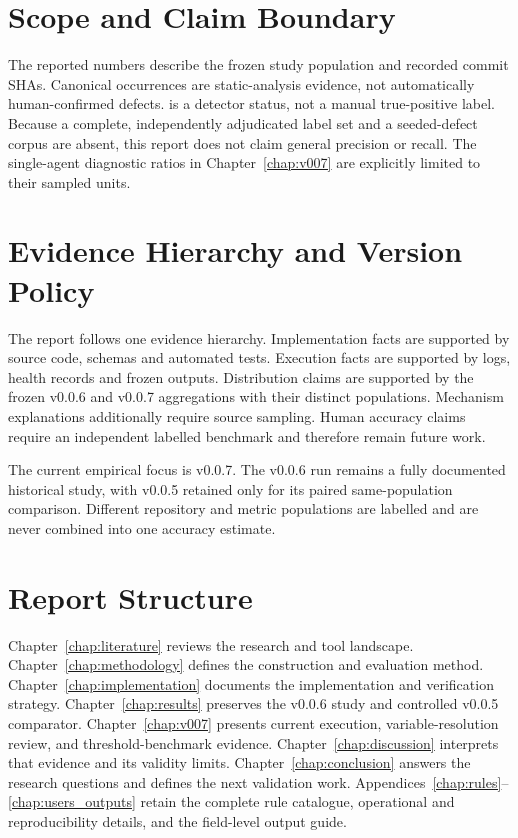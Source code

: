 \section{Scope and Claim Boundary}
The reported numbers describe the frozen study population and recorded commit
SHAs. Canonical occurrences are static-analysis evidence, not automatically
human-confirmed defects.  is a detector status, not a manual
true-positive label. Because a complete, independently adjudicated label set
and a seeded-defect corpus are absent, this report does not claim general
precision or recall. The single-agent diagnostic ratios in
Chapter~\ref{chap:v007} are explicitly limited to their sampled units.

\section{Evidence Hierarchy and Version Policy}
The report follows one evidence hierarchy. Implementation facts are supported
by source code, schemas and automated tests. Execution facts are supported by
logs, health records and frozen outputs. Distribution claims are supported by
the frozen v0.0.6 and v0.0.7 aggregations with their distinct populations.
Mechanism explanations additionally require source sampling. Human accuracy
claims require an independent labelled
benchmark and therefore remain future work.

The current empirical focus is v0.0.7. The v0.0.6 run remains a fully
documented historical study, with v0.0.5 retained only for its paired
same-population comparison. Different repository and metric populations are
labelled and are never combined into one accuracy estimate.

\section{Report Structure}
Chapter~\ref{chap:literature} reviews the research and tool landscape.
Chapter~\ref{chap:methodology} defines the construction and evaluation method.
Chapter~\ref{chap:implementation} documents the implementation and verification
strategy. Chapter~\ref{chap:results} preserves the v0.0.6 study and controlled
v0.0.5 comparator. Chapter~\ref{chap:v007} presents current execution,
variable-resolution review, and threshold-benchmark evidence.
Chapter~\ref{chap:discussion} interprets that evidence and its validity limits.
Chapter~\ref{chap:conclusion} answers the research questions and defines the
next validation work. Appendices~\ref{chap:rules}--\ref{chap:users_outputs}
retain the complete rule catalogue, operational and reproducibility details,
and the field-level output guide.
